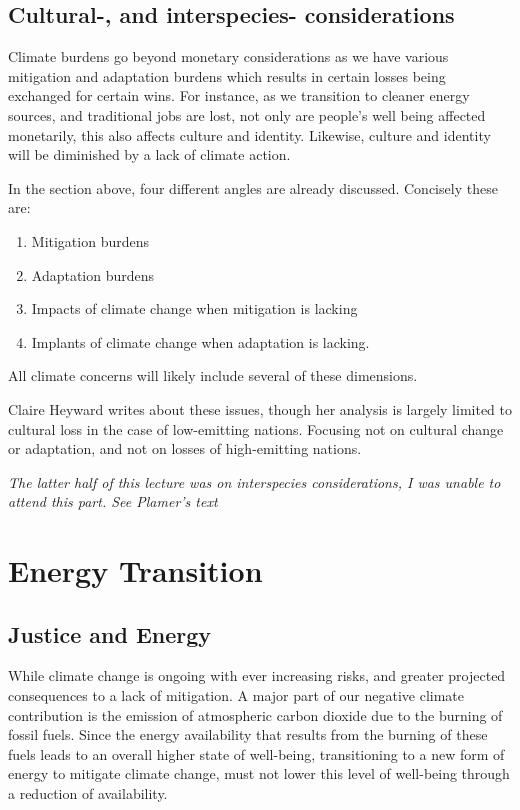 \documentclass[12pt]{report}
\begin{document}
\chapter{Cultural-, and interspecies- considerations}

Climate burdens go beyond monetary considerations as we have various mitigation
and adaptation burdens which results in certain losses being exchanged for
certain wins. For instance, as we transition to cleaner energy sources, and
traditional jobs are lost, not only are people's well being affected monetarily,
this also affects culture and identity. Likewise, culture and identity will be
diminished by a lack of climate action.

In the section above, four different angles are already discussed. Concisely
these are:
\begin{enumerate}
	\item
		Mitigation burdens
	\item
		Adaptation burdens
	\item
		Impacts of climate change when mitigation is lacking
	\item
		Implants of climate change when adaptation is lacking.
\end{enumerate}
All climate concerns will likely include several of these dimensions.

Claire Heyward writes about these issues, though her analysis is largely limited
to cultural loss in the case of low-emitting nations. Focusing not on cultural
change or adaptation, and not on losses of high-emitting nations.


\textit{The latter half of this lecture was on interspecies considerations, I
was unable to attend this part. See Plamer's text}

\part{Energy Transition}
\chapter{Justice and Energy}

While climate change is ongoing with ever increasing risks, and greater
projected consequences to a lack of mitigation. A major part of our negative
climate contribution is the emission of atmospheric carbon dioxide due to the
burning of fossil fuels. Since the energy availability that results from the
burning of these fuels leads to an overall higher state of well-being,
transitioning to a new form of energy to mitigate climate change, must not lower
this level of well-being through a reduction of availability.
\end{document}
